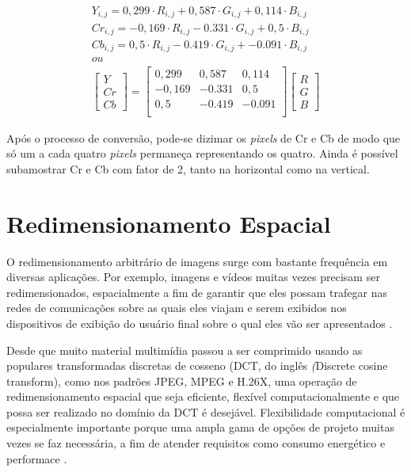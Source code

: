 \begin{center}
	\begin{equation}
	\begin{split}
	Y_{i,j} = 0,299\cdot R_{i,j} + 0,587\cdot G_{i,j} + 0,114\cdot B_{i,j}\\
	Cr_{i,j} = -0,169\cdot R_{i,j} -0.331\cdot G_{i,j} + 0,5\cdot B_{i,j}\\
	Cb_{i,j} = 0,5\cdot R_{i,j} -0.419\cdot G_{i,j} + -0.091\cdot B_{i,j}\\
	ou \\
	\begin{bmatrix}		
	Y\\ Cr \\ Cb
	\end{bmatrix}
	 = 
	\begin{bmatrix}
  		0,299 & 0,587 &  0,114 \\
  		-0,169 &-0.331 & 0,5 \\
  		0,5  & -0.419  & -0.091\\
	\end{bmatrix}
	\begin{bmatrix}
	R\\ G \\ B
	\end{bmatrix}
	\label{rgb2yuv} 
	\end{split}
	\end{equation}

\end{center}

\noindent Após o processo de conversão, pode-se dizimar os \textit{pixels} de Cr e Cb de modo que só um a cada quatro \textit{pixels} permaneça representando os quatro. Ainda é possível subamostrar Cr e Cb com fator de 2, tanto na horizontal como na vertical.


\section{Redimensionamento Espacial}
 \label{DCT}
O redimensionamento arbitrário de imagens surge com bastante frequência em diversas aplicações. Por exemplo, imagens e vídeos muitas vezes precisam ser redimensionados, espacialmente a fim de garantir que eles possam trafegar nas redes de comunicações sobre as quais eles viajam e serem exibidos nos dispositivos de exibição do usuário final sobre o qual eles vão ser apresentados \cite{salazar2007complexity}.
 
Desde que muito material multimídia passou a ser comprimido usando as populares transformadas discretas de cosseno (DCT, do inglês \textit({Discrete cosine transform}), como nos padrões JPEG, MPEG e H.26X, uma operação de redimensionamento espacial que seja eficiente, flexível computacionalmente e que possa ser realizado no domínio da DCT é desejável. Flexibilidade computacional é especialmente importante porque uma ampla gama de opções de projeto muitas vezes se faz necessária, a fim de atender requisitos como consumo energético e performace \cite{salazar2007complexity}.

